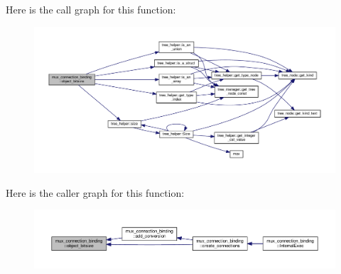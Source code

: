 Here is the call graph for this function\+:
\nopagebreak
\begin{figure}[H]
\begin{center}
\leavevmode
\includegraphics[width=350pt]{d7/d1e/classmux__connection__binding_a5a1ab44883c4e500c1a23724fbff9364_cgraph}
\end{center}
\end{figure}
Here is the caller graph for this function\+:
\nopagebreak
\begin{figure}[H]
\begin{center}
\leavevmode
\includegraphics[width=350pt]{d7/d1e/classmux__connection__binding_a5a1ab44883c4e500c1a23724fbff9364_icgraph}
\end{center}
\end{figure}
\mbox{\label{classmux__connection__binding_a2eccd06bada7e07af12b2e14918dbbfa}} 
